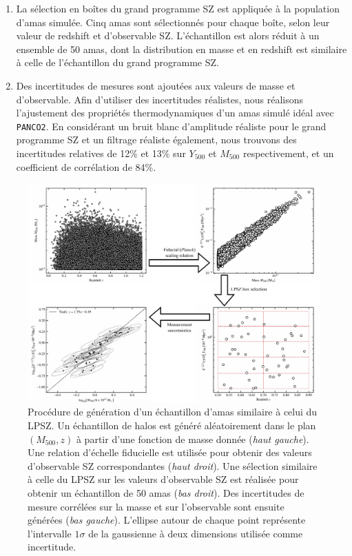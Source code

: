 \begin{enumerate}[leftmargin=*]
    \item La sélection en boîtes du grand programme SZ est appliquée à la population d'amas simulée.
        Cinq amas sont sélectionnés pour chaque boîte, selon leur valeur de redshift et d'observable SZ.
        L'échantillon est alors réduit à un ensemble de 50 amas, dont la distribution en masse et en redshift est similaire à celle de l'échantillon du grand programme SZ.
    \item Des incertitudes de mesures sont ajoutées aux valeurs de masse et d'observable.
        Afin d'utiliser des incertitudes réalistes, nous réalisons l'ajustement des propriétés thermodynamiques d'un amas simulé idéal avec \texttt{PANCO2}.
        En considérant un bruit blanc d'amplitude réaliste pour le grand programme SZ et un filtrage réaliste également, nous trouvons des incertitudes relatives de 12\% et 13\% sur $Y_{500}$ et $M_{500}$ respectivement, et un coefficient de corrélation de 84\%.
\end{enumerate}

\begin{figure}[t]
    \centering
    \includegraphics[width=\linewidth]{Figures/Chap_scaling/LPSZ/lpsz_sample_gen.pdf}
    \caption{
        Procédure de génération d'un échantillon d'amas similaire à celui du LPSZ.
        Un échantillon de halos est généré aléatoirement dans le plan $(M_{500}, z)$ à partir d'une fonction de masse donnée (\textit{haut gauche}).
        Une relation d'échelle fiducielle est utilisée pour obtenir des valeurs d'observable SZ correspondantes (\textit{haut droit}).
        Une sélection similaire à celle du LPSZ sur les valeurs d'observable SZ est réalisée pour obtenir un échantillon de 50 amas (\textit{bas droit}).
        Des incertitudes de mesure corrélées sur la masse et sur l'observable sont ensuite générées (\textit{bas gauche}).
        L'ellipse autour de chaque point représente l'intervalle $1\sigma$ de la gaussienne à deux dimensions utilisée comme incertitude.
    }
    \label{fig:scaling:lpsz_sample_gen}
\end{figure}


